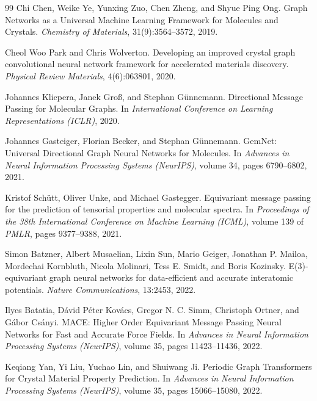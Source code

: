 \documentclass[a4paper,11pt]{article}
\begin{document}
\begin{thebibliography}{99}
Chi Chen, Weike Ye, Yunxing Zuo, Chen Zheng, and Shyue Ping Ong.
\newblock Graph Networks as a Universal Machine Learning Framework for Molecules and Crystals.
\newblock \emph{Chemistry of Materials}, 31(9):3564--3572, 2019.

Cheol Woo Park and Chris Wolverton.
\newblock Developing an improved crystal graph convolutional neural network framework for accelerated materials discovery.
\newblock \emph{Physical Review Materials}, 4(6):063801, 2020.

Johannes Klicpera, Janek Gro{\ss}, and Stephan G\"unnemann.
\newblock Directional Message Passing for Molecular Graphs.
\newblock In \emph{International Conference on Learning Representations (ICLR)}, 2020.

Johannes Gasteiger, Florian Becker, and Stephan G\"unnemann.
\newblock GemNet: Universal Directional Graph Neural Networks for Molecules.
\newblock In \emph{Advances in Neural Information Processing Systems (NeurIPS)}, volume 34, pages 6790--6802, 2021.

Kristof Sch\"utt, Oliver Unke, and Michael Gastegger.
\newblock Equivariant message passing for the prediction of tensorial properties and molecular spectra.
\newblock In \emph{Proceedings of the 38th International Conference on Machine Learning (ICML)}, volume 139 of \emph{PMLR}, pages 9377--9388, 2021.

Simon Batzner, Albert Musaelian, Lixin Sun, Mario Geiger, Jonathan P. Mailoa, Mordechai Kornbluth, Nicola Molinari, Tess E. Smidt, and Boris Kozinsky.
\newblock E(3)-equivariant graph neural networks for data-efficient and accurate interatomic potentials.
\newblock \emph{Nature Communications}, 13:2453, 2022.

Ilyes Batatia, D\'avid P\'eter Kov\'acs, Gregor N. C. Simm, Christoph Ortner, and G\'abor Cs\'anyi.
\newblock MACE: Higher Order Equivariant Message Passing Neural Networks for Fast and Accurate Force Fields.
\newblock In \emph{Advances in Neural Information Processing Systems (NeurIPS)}, volume 35, pages 11423--11436, 2022.

Keqiang Yan, Yi Liu, Yuchao Lin, and Shuiwang Ji.
\newblock Periodic Graph Transformers for Crystal Material Property Prediction.
\newblock In \emph{Advances in Neural Information Processing Systems (NeurIPS)}, volume 35, pages 15066--15080, 2022.


\end{thebibliography}
\end{document}
